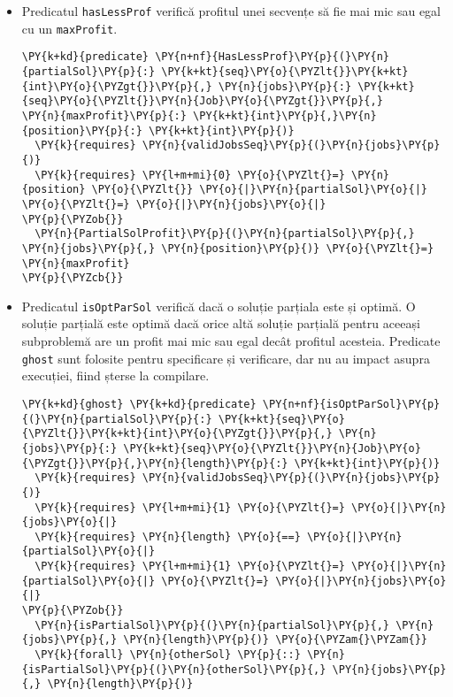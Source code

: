 \begin{itemize}
    \item Predicatul \texttt{hasLessProf} verifică profitul unei secvențe să fie mai mic sau egal cu un \texttt{maxProfit}. 
    \begin{Verbatim}[commandchars=\\\{\}, fontsize=\footnotesize]
\PY{k+kd}{predicate} \PY{n+nf}{HasLessProf}\PY{p}{(}\PY{n}{partialSol}\PY{p}{:} \PY{k+kt}{seq}\PY{o}{\PYZlt{}}\PY{k+kt}{int}\PY{o}{\PYZgt{}}\PY{p}{,} \PY{n}{jobs}\PY{p}{:} \PY{k+kt}{seq}\PY{o}{\PYZlt{}}\PY{n}{Job}\PY{o}{\PYZgt{}}\PY{p}{,}  
\PY{n}{maxProfit}\PY{p}{:} \PY{k+kt}{int}\PY{p}{,}\PY{n}{position}\PY{p}{:} \PY{k+kt}{int}\PY{p}{)}
  \PY{k}{requires} \PY{n}{validJobsSeq}\PY{p}{(}\PY{n}{jobs}\PY{p}{)}
  \PY{k}{requires} \PY{l+m+mi}{0} \PY{o}{\PYZlt{}=} \PY{n}{position} \PY{o}{\PYZlt{}} \PY{o}{|}\PY{n}{partialSol}\PY{o}{|} \PY{o}{\PYZlt{}=} \PY{o}{|}\PY{n}{jobs}\PY{o}{|}
\PY{p}{\PYZob{}}
  \PY{n}{PartialSolProfit}\PY{p}{(}\PY{n}{partialSol}\PY{p}{,} \PY{n}{jobs}\PY{p}{,} \PY{n}{position}\PY{p}{)} \PY{o}{\PYZlt{}=} \PY{n}{maxProfit}
\PY{p}{\PYZcb{}}
\end{Verbatim}
    \item Predicatul \texttt{isOptParSol} verifică dacă o soluție parțiala este și optimă. O soluție parțială este optimă dacă orice altă soluție parțială pentru aceeași subproblemă are un profit mai mic sau egal decât profitul acesteia. Predicate \texttt{ghost} sunt folosite pentru specificare și verificare, dar nu au impact asupra execuției, fiind șterse la compilare. 
    \begin{Verbatim}[commandchars=\\\{\}, fontsize=\footnotesize]
\PY{k+kd}{ghost} \PY{k+kd}{predicate} \PY{n+nf}{isOptParSol}\PY{p}{(}\PY{n}{partialSol}\PY{p}{:} \PY{k+kt}{seq}\PY{o}{\PYZlt{}}\PY{k+kt}{int}\PY{o}{\PYZgt{}}\PY{p}{,} \PY{n}{jobs}\PY{p}{:} \PY{k+kt}{seq}\PY{o}{\PYZlt{}}\PY{n}{Job}\PY{o}{\PYZgt{}}\PY{p}{,}\PY{n}{length}\PY{p}{:} \PY{k+kt}{int}\PY{p}{)}
  \PY{k}{requires} \PY{n}{validJobsSeq}\PY{p}{(}\PY{n}{jobs}\PY{p}{)}
  \PY{k}{requires} \PY{l+m+mi}{1} \PY{o}{\PYZlt{}=} \PY{o}{|}\PY{n}{jobs}\PY{o}{|} 
  \PY{k}{requires} \PY{n}{length} \PY{o}{==} \PY{o}{|}\PY{n}{partialSol}\PY{o}{|}
  \PY{k}{requires} \PY{l+m+mi}{1} \PY{o}{\PYZlt{}=} \PY{o}{|}\PY{n}{partialSol}\PY{o}{|} \PY{o}{\PYZlt{}=} \PY{o}{|}\PY{n}{jobs}\PY{o}{|}
\PY{p}{\PYZob{}}
  \PY{n}{isPartialSol}\PY{p}{(}\PY{n}{partialSol}\PY{p}{,} \PY{n}{jobs}\PY{p}{,} \PY{n}{length}\PY{p}{)} \PY{o}{\PYZam{}\PYZam{}}
  \PY{k}{forall} \PY{n}{otherSol} \PY{p}{::} \PY{n}{isPartialSol}\PY{p}{(}\PY{n}{otherSol}\PY{p}{,} \PY{n}{jobs}\PY{p}{,} \PY{n}{length}\PY{p}{)}

\end{Verbatim}
\end{itemize}
